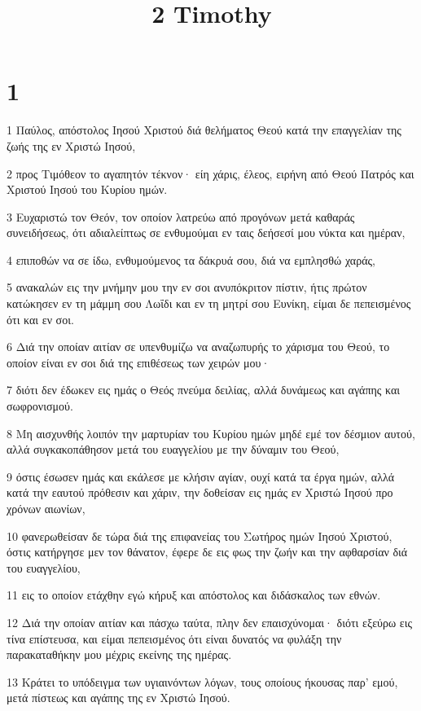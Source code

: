 

\title{2 Timothy}


\chapter{1}

\par 1 Παύλος, απόστολος Ιησού Χριστού διά θελήματος Θεού κατά την επαγγελίαν της ζωής της εν Χριστώ Ιησού,
\par 2 προς Τιμόθεον το αγαπητόν τέκνον· είη χάρις, έλεος, ειρήνη από Θεού Πατρός και Χριστού Ιησού του Κυρίου ημών.
\par 3 Ευχαριστώ τον Θεόν, τον οποίον λατρεύω από προγόνων μετά καθαράς συνειδήσεως, ότι αδιαλείπτως σε ενθυμούμαι εν ταις δεήσεσί μου νύκτα και ημέραν,
\par 4 επιποθών να σε ίδω, ενθυμούμενος τα δάκρυά σου, διά να εμπλησθώ χαράς,
\par 5 ανακαλών εις την μνήμην μου την εν σοι ανυπόκριτον πίστιν, ήτις πρώτον κατώκησεν εν τη μάμμη σου Λωΐδι και εν τη μητρί σου Ευνίκη, είμαι δε πεπεισμένος ότι και εν σοι.
\par 6 Διά την οποίαν αιτίαν σε υπενθυμίζω να αναζωπυρής το χάρισμα του Θεού, το οποίον είναι εν σοι διά της επιθέσεως των χειρών μου·
\par 7 διότι δεν έδωκεν εις ημάς ο Θεός πνεύμα δειλίας, αλλά δυνάμεως και αγάπης και σωφρονισμού.
\par 8 Μη αισχυνθής λοιπόν την μαρτυρίαν του Κυρίου ημών μηδέ εμέ τον δέσμιον αυτού, αλλά συγκακοπάθησον μετά του ευαγγελίου με την δύναμιν του Θεού,
\par 9 όστις έσωσεν ημάς και εκάλεσε με κλήσιν αγίαν, ουχί κατά τα έργα ημών, αλλά κατά την εαυτού πρόθεσιν και χάριν, την δοθείσαν εις ημάς εν Χριστώ Ιησού προ χρόνων αιωνίων,
\par 10 φανερωθείσαν δε τώρα διά της επιφανείας του Σωτήρος ημών Ιησού Χριστού, όστις κατήργησε μεν τον θάνατον, έφερε δε εις φως την ζωήν και την αφθαρσίαν διά του ευαγγελίου,
\par 11 εις το οποίον ετάχθην εγώ κήρυξ και απόστολος και διδάσκαλος των εθνών.
\par 12 Διά την οποίαν αιτίαν και πάσχω ταύτα, πλην δεν επαισχύνομαι· διότι εξεύρω εις τίνα επίστευσα, και είμαι πεπεισμένος ότι είναι δυνατός να φυλάξη την παρακαταθήκην μου μέχρις εκείνης της ημέρας.
\par 13 Κράτει το υπόδειγμα των υγιαινόντων λόγων, τους οποίους ήκουσας παρ' εμού, μετά πίστεως και αγάπης της εν Χριστώ Ιησού.
